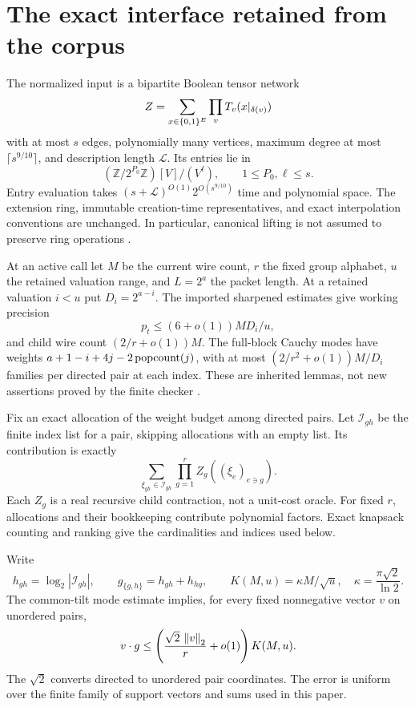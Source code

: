 \section{The exact interface retained from the corpus}\label{sec:interface}

The normalized input is a bipartite Boolean tensor network
\[
 Z=\sum_{x\in\{0,1\}^E}\prod_{v}T_v(x|_{\delta(v)})
\]
with at most \(s\) edges, polynomially many vertices, maximum degree at
most \(\lceil s^{9/10}\rceil\), and description length \(\mathcal L\).
Its entries lie in
\[
  (\mathbb Z/2^{P_0}\mathbb Z)[V]/(V^\ell),\qquad
  1\le P_0,\ell\le s.
\]
Entry evaluation takes \((s+\mathcal L)^{O(1)}2^{O(s^{9/10})}\) time
and polynomial space. The extension ring, immutable creation-time
representatives, and exact interpolation conventions are unchanged.
In particular, canonical lifting is not assumed to preserve ring
operations \cite{source,asymmetric,pairwise}.

At an active call let \(M\) be the current wire count, \(r\) the fixed
group alphabet, \(u\) the retained valuation range, and \(L=2^a\) the
packet length. At a retained valuation \(i<u\) put \(D_i=2^{a-i}\).
The imported sharpened estimates give working precision
\[
 p_t\le(6+o(1))MD_i/u,
\]
and child wire count \((2/r+o(1))M\). The full-block Cauchy modes have
weights \(a+1-i+4j-2\operatorname{popcount}(j)\), with at most
\((2/r^2+o(1))M/D_i\) families per directed pair at each index.
These are inherited lemmas, not new assertions proved by the finite
checker \cite{joint,pairwise}.

Fix an exact allocation of the weight budget among directed pairs.
Let \(\mathcal I_{gh}\) be the finite index list for a pair, skipping
allocations with an empty list. Its contribution is exactly
\begin{equation}\label{eq:exactmode}
 \sum_{\xi_{gh}\in\mathcal I_{gh}}
       \prod_{g=1}^r Z_g((\xi_e)_{e\ni g}).
\end{equation}
Each \(Z_g\) is a real recursive child contraction, not a unit-cost
oracle. For fixed \(r\), allocations and their bookkeeping contribute
polynomial factors. Exact knapsack counting and ranking give the
cardinalities and indices used below.

Write
\[
 h_{gh}=\log_2|\mathcal I_{gh}|,\qquad
 g_{\{g,h\}}=h_{gh}+h_{hg},\qquad
 K(M,u)=\kappa M/\sqrt u,\quad
 \kappa=\frac{\pi\sqrt2}{\ln2}.
\]
The common-tilt mode estimate implies, for every fixed nonnegative vector
\(v\) on unordered pairs,
\begin{equation}\label{eq:entropy}
 v\cdot g\le
 \left(\frac{\sqrt2\,\left\lVert v\right\rVert_2}{r}+o(1)\right)K(M,u).
\end{equation}
The \(\sqrt2\) converts directed to unordered pair coordinates. The
error is uniform over the finite family of support vectors and sums
used in this paper.

